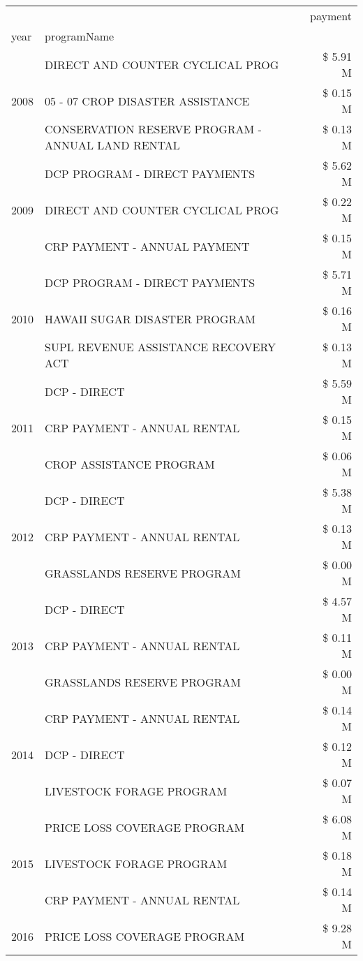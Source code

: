 \begin{tabular}{llr}
\toprule
 &  & payment \\
year & programName &  \\
\midrule
\multirow[t]{3}{*}{2008} & DIRECT AND COUNTER CYCLICAL PROG & \$ 5.91 M \\
 & 05 - 07 CROP DISASTER ASSISTANCE & \$ 0.15 M \\
 & CONSERVATION RESERVE PROGRAM - ANNUAL LAND RENTAL & \$ 0.13 M \\
\cline{1-3}
\multirow[t]{3}{*}{2009} & DCP PROGRAM - DIRECT PAYMENTS & \$ 5.62 M \\
 & DIRECT AND COUNTER CYCLICAL PROG & \$ 0.22 M \\
 & CRP PAYMENT - ANNUAL PAYMENT & \$ 0.15 M \\
\cline{1-3}
\multirow[t]{3}{*}{2010} & DCP PROGRAM - DIRECT PAYMENTS & \$ 5.71 M \\
 & HAWAII SUGAR DISASTER PROGRAM & \$ 0.16 M \\
 & SUPL REVENUE ASSISTANCE RECOVERY ACT & \$ 0.13 M \\
\cline{1-3}
\multirow[t]{3}{*}{2011} & DCP - DIRECT & \$ 5.59 M \\
 & CRP PAYMENT - ANNUAL RENTAL & \$ 0.15 M \\
 & CROP ASSISTANCE PROGRAM & \$ 0.06 M \\
\cline{1-3}
\multirow[t]{3}{*}{2012} & DCP - DIRECT & \$ 5.38 M \\
 & CRP PAYMENT - ANNUAL RENTAL & \$ 0.13 M \\
 & GRASSLANDS RESERVE PROGRAM & \$ 0.00 M \\
\cline{1-3}
\multirow[t]{3}{*}{2013} & DCP - DIRECT & \$ 4.57 M \\
 & CRP PAYMENT - ANNUAL RENTAL & \$ 0.11 M \\
 & GRASSLANDS RESERVE PROGRAM & \$ 0.00 M \\
\cline{1-3}
\multirow[t]{3}{*}{2014} & CRP PAYMENT - ANNUAL RENTAL & \$ 0.14 M \\
 & DCP - DIRECT & \$ 0.12 M \\
 & LIVESTOCK FORAGE PROGRAM & \$ 0.07 M \\
\cline{1-3}
\multirow[t]{3}{*}{2015} & PRICE LOSS COVERAGE PROGRAM & \$ 6.08 M \\
 & LIVESTOCK FORAGE PROGRAM & \$ 0.18 M \\
 & CRP PAYMENT - ANNUAL RENTAL & \$ 0.14 M \\
\cline{1-3}
\multirow[t]{3}{*}{2016} & PRICE LOSS COVERAGE PROGRAM & \$ 9.28 M \\

\end{tabular}
